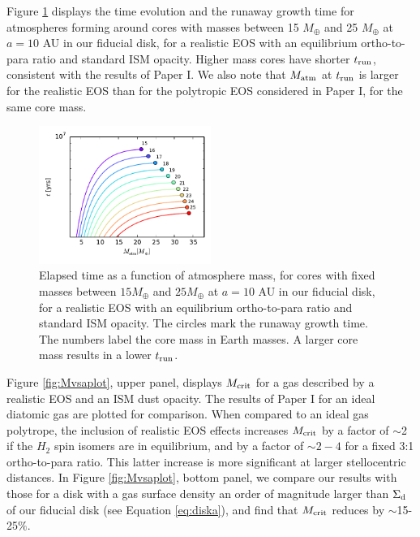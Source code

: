 
Figure \ref{fig:tvsMplot} displays the time evolution and the runaway growth time for atmospheres forming around cores with masses between 15 $M_{\oplus}$ and 25 $M_{\oplus}$ at $a=10$ AU in our fiducial disk, for a realistic EOS with an equilibrium ortho-to-para ratio and standard ISM opacity. Higher mass cores have shorter $t_{\rm run}$, consistent with the results of Paper I. We also note that $M_{\rm atm}$ at $t_{\rm run}$ is larger for the realistic EOS than for the polytropic EOS considered in Paper I, for the same core mass.

\begin{figure}[htb]
\centering
\includegraphics[width=0.5\textwidth]{figures/t_vs_M_10au.pdf}
\caption{Elapsed time as a function of atmosphere mass, for cores with fixed masses between $15 M_{\oplus}$ and $25 M_{\oplus}$ at $a=10$ AU in our fiducial disk, for a realistic EOS with an equilibrium ortho-to-para ratio and standard ISM opacity. The circles mark the runaway growth time. The numbers label the core mass in Earth masses. A larger core mass results in a lower $t_{\rm run}$.}%
\label{fig:tvsMplot}
\end{figure}



Figure \ref{fig:Mvsaplot}, upper panel, displays $M_{\rm crit}$
for a gas described by a realistic EOS and an ISM dust opacity. The results of Paper I for an ideal diatomic gas are plotted for comparison. When compared to an ideal gas polytrope, the inclusion of realistic EOS effects increases $M_{\rm crit}$ by a factor of $\sim$2 if the $H_2$ spin isomers are in equilibrium, and by a factor of $\sim$$2-4$ for a fixed 3:1 ortho-to-para ratio. This latter increase is more significant at larger stellocentric distances. In Figure \ref{fig:Mvsaplot}, bottom panel, we compare our results with those for a disk with a gas surface density an order of magnitude larger than $\Sigma_{\rm d}$ of our fiducial disk (see Equation \ref{eq:diska}), and find that $M_{\rm crit}$ reduces by $\sim$15-25$\%$.

